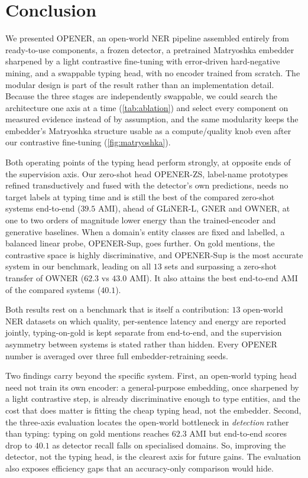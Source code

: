 \section{Conclusion}
\label{sec:conclusion}

We presented OPENER, an open-world NER pipeline assembled entirely from ready-to-use components, a frozen detector, a pretrained Matryoshka embedder sharpened by a light contrastive fine-tuning with error-driven hard-negative mining, and a swappable typing head, with no encoder trained from scratch.
The modular design is part of the result rather than an implementation detail. Because the three stages are independently swappable, we could search the architecture one axis at a time (\autoref{tab:ablation}) and select every component on measured evidence instead of by assumption, and the same modularity keeps the embedder's Matryoshka structure usable as a compute/quality knob even after our contrastive fine-tuning (\autoref{fig:matryoshka}).

Both operating points of the typing head perform strongly, at opposite ends of the supervision axis.
Our zero-shot head OPENER-ZS, label-name prototypes refined transductively and fused with the detector's own predictions, needs no target labels at typing time and is still the best of the compared zero-shot systems end-to-end ($39.5$ AMI), ahead of GLiNER-L, GNER and OWNER, at one to two orders of magnitude lower energy than the trained-encoder and generative baselines.
When a domain's entity classes are fixed and labelled, a balanced linear probe, OPENER-Sup, goes further. On gold mentions, the contrastive space is highly discriminative, and OPENER-Sup is the most accurate system in our benchmark, leading on all $13$ sets and surpassing a zero-shot transfer of OWNER ($62.3$ vs $43.0$ AMI). It also attains the best end-to-end AMI of the compared systems ($40.1$).

Both results rest on a benchmark that is itself a contribution: $13$ open-world NER datasets on which quality, per-sentence latency and energy are reported jointly, typing-on-gold is kept separate from end-to-end, and the supervision asymmetry between systems is stated rather than hidden. Every OPENER number is averaged over three full embedder-retraining seeds.

Two findings carry beyond the specific system.
First, an open-world typing head need not train its own encoder: a general-purpose embedding, once sharpened by a light contrastive step, is already discriminative enough to type entities, and the cost that does matter is fitting the cheap typing head, not the embedder.
Second, the three-axis evaluation locates the open-world bottleneck in \emph{detection} rather than typing: typing on gold mentions reaches $62.3$ AMI but end-to-end scores drop to $40.1$ as detector recall falls on specialised domains. So, improving the detector, not the typing head, is the clearest axis for future gains. The evaluation also exposes efficiency gaps that an accuracy-only comparison would hide.

